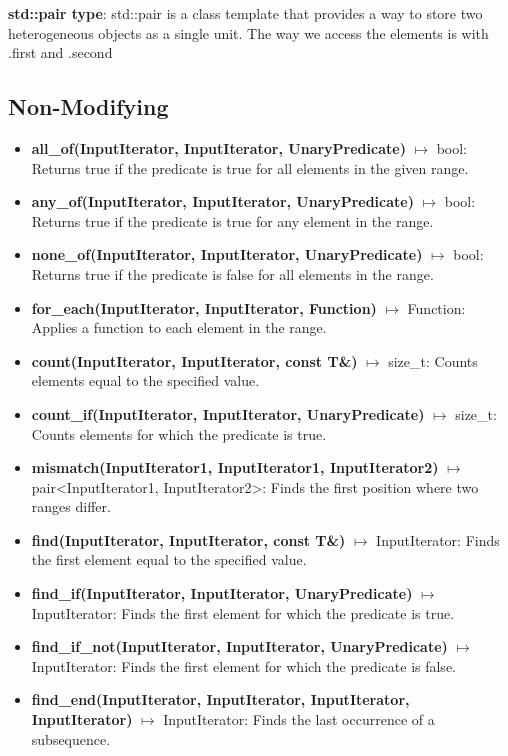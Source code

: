 \documentclass{report}
\begin{document}
    \bigbreak \noindent  
    \textbf{std::pair type}: std::pair is a class template that provides a way to store two heterogeneous objects as a single unit. The way we access the elements is with .first and .second
    \subsection{Non-Modifying}
    \begin{itemize}
        \item \textbf{all\_of(InputIterator, InputIterator, UnaryPredicate)} \(\mapsto\) bool: Returns true if the predicate is true for all elements in the given range.
        \item \textbf{any\_of(InputIterator, InputIterator, UnaryPredicate)} \(\mapsto\) bool: Returns true if the predicate is true for any element in the range.
        \item \textbf{none\_of(InputIterator, InputIterator, UnaryPredicate)} \(\mapsto\) bool: Returns true if the predicate is false for all elements in the range.
        \item \textbf{for\_each(InputIterator, InputIterator, Function)} \(\mapsto\) Function: Applies a function to each element in the range.
        \item \textbf{count(InputIterator, InputIterator, const T\&)} \(\mapsto\) size\_t: Counts elements equal to the specified value.
        \item \textbf{count\_if(InputIterator, InputIterator, UnaryPredicate)} \(\mapsto\) size\_t: Counts elements for which the predicate is true.
        \item \textbf{mismatch(InputIterator1, InputIterator1, InputIterator2)} \(\mapsto\) pair<InputIterator1, InputIterator2>: Finds the first position where two ranges differ.
        \item \textbf{find(InputIterator, InputIterator, const T\&)} \(\mapsto\) InputIterator: Finds the first element equal to the specified value.
        \item \textbf{find\_if(InputIterator, InputIterator, UnaryPredicate)} \(\mapsto\) InputIterator: Finds the first element for which the predicate is true.
        \item \textbf{find\_if\_not(InputIterator, InputIterator, UnaryPredicate)} \(\mapsto\) InputIterator: Finds the first element for which the predicate is false.
        \item \textbf{find\_end(InputIterator, InputIterator, InputIterator, InputIterator)} \(\mapsto\) InputIterator: Finds the last occurrence of a subsequence.

\end{itemize}
\end{document}

